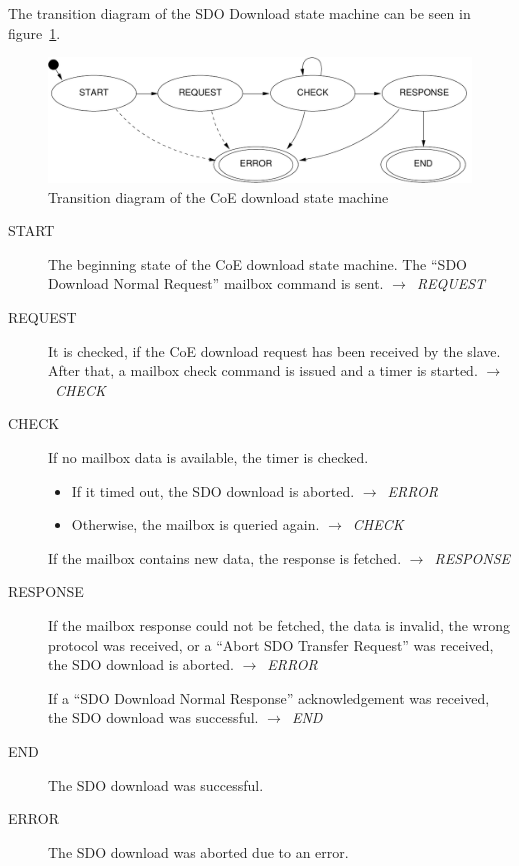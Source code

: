 \documentclass[a4paper,12pt,BCOR6mm,bibtotoc,idxtotoc]{scrbook}
\begin{document}
The transition diagram of the SDO Download state machine can be seen
in figure~\ref{fig:fsm-coedown}.

\begin{figure}[htbp]
  \centering
  \includegraphics[width=.9\textwidth]{images/fsm-coedown}
  \caption{Transition diagram of the CoE download state machine}
  \label{fig:fsm-coedown}
\end{figure}

\begin{description}
\item[START] The beginning state of the CoE download state
  machine. The ``SDO Download Normal Request'' mailbox command is
  sent. $\rightarrow$~\textit{REQUEST}

\item[REQUEST] It is checked, if the CoE download request has been
  received by the slave. After that, a mailbox check command is issued
  and a timer is started. $\rightarrow$~\textit{CHECK}

\item[CHECK] If no mailbox data is available, the timer is checked.
  \begin{itemize}
  \item If it timed out, the SDO download is aborted.
    $\rightarrow$~\textit{ERROR}
  \item Otherwise, the mailbox is queried again.
    $\rightarrow$~\textit{CHECK}
  \end{itemize}

  If the mailbox contains new data, the response is fetched.
  $\rightarrow$~\textit{RESPONSE}

\item[RESPONSE] If the mailbox response could not be fetched, the data
  is invalid, the wrong protocol was received, or a ``Abort SDO
  Transfer Request'' was received, the SDO download is aborted.
  $\rightarrow$~\textit{ERROR}

  If a ``SDO Download Normal Response'' acknowledgement was received,
  the SDO download was successful. $\rightarrow$~\textit{END}

\item[END] The SDO download was successful.

\item[ERROR] The SDO download was aborted due to an error.

\end{description}
\end{document}
